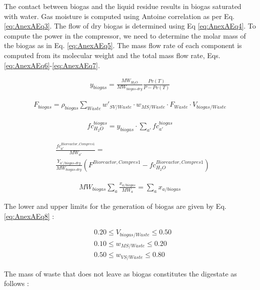 \begin{refsection}[referencesCh2]
The contact between biogas and the liquid residue results in biogas saturated with water. Gas moisture is computed using Antoine correlation as per Eq. \ref{eq:AnexAEq3}. The flow of dry biogas is determined using Eq \ref{eq:AnexAEq4}. To compute the power in the compressor, we need to determine the molar mass of the biogas as in Eq. \ref{eq:AnexAEq5}. The mass flow rate of each component is computed from its molecular weight and the total mass flow rate,  Eqs. \ref{eq:AnexAEq6}-\ref{eq:AnexAEq7}. 

\begin{align}
	y_{biogas} = \frac{MW_{H_{2}O}}{MW_{biogas\text{-}dry}}\frac{Pv(T)}{P - Pv(T)} \label{eq:AnexAEq3}
\end{align} 

\begin{align}
	{F}_{biogas} = \rho_{biogas} \sum\limits_{Waste} {w'_{SV/Waste} \cdot {w}_{MS/Waste} \cdot {F}_{Waste} \cdot {V}_{biogas/Waste}} \label{eq:AnexAEq4}
\end{align}

\begin{align}
	fc_{H_{2}O}^{biogas} = y_{biogas} \cdot \sum\limits_{a'} {fc_{a'}^{biogas}} \label{eq:AnexAEq5}
\end{align}

\begin{align}
	& \frac{fc_{a'}^{Bioreactor,Compres1}}{MW_{a'}} = \label{eq:AnexAEq6} \\
	& \frac{Y_{a'/biogas\text{-} dry}}{MW_{biogas\text{-} dry}} \left( F^{Bioreactor,Compres1} - fc_{H_{2}O}^{Bioreactor,Compres1}\right)  \nonumber
\end{align}

\begin{align}
	MW_{biogas} \sum\limits_{a} {\frac{x_{a/biogas}}{MW_{a}} = \sum\limits_{a} {x_{a/biogas}}} \label{eq:AnexAEq7}
\end{align}

The lower and upper limits for the generation of biogas are given by Eq. \ref{eq:AnexAEq8} \citep{AlSeadi2008}:

\begin{align}
	& 0.20 \le V_{biogas/Waste} \le 0.50 \nonumber \\
	& 0.10 \le w_{MS/Waste}  \le 0.20 \label{eq:AnexAEq8} \\					
	& 0.50 \le w_{VS/Waste}  \le 0.80 \nonumber
\end{align}

The mass of waste that does not leave as biogas constitutes the digestate as follows \citep{AlSeadi2008}:


\end{refsection}
